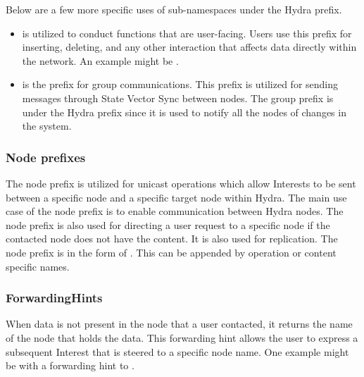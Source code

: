 Below are a few more specific uses of sub-namespaces under the Hydra prefix.
\begin{itemize}
    \item {} is utilized to conduct functions that are user-facing. Users use this prefix for inserting, deleting, and any other interaction that affects data directly within the network. An example might be .

    \item {} is the prefix for group communications. This prefix is utilized for sending messages through State Vector Sync between nodes. The group prefix is under the Hydra prefix since it is used to notify all the nodes of changes in the system.
    
\end{itemize}

\subsubsection{Node prefixes}
The node prefix is utilized for unicast operations which allow Interests to be sent between a specific node and a specific target node within Hydra. The main use case of the node prefix is to enable communication between Hydra nodes. The node prefix is also used for directing a user request to a specific node if the contacted node does not have the content. It is also used for replication.
The node prefix is in the form of . This can be appended by operation or content specific names.

\subsubsection{ForwardingHints}
When data is not present in the node that a user contacted, it returns the name of the node that holds the data. This forwarding hint allows the user to express a subsequent Interest that is steered to a specific node name. 
One example might be  with a forwarding hint to .


